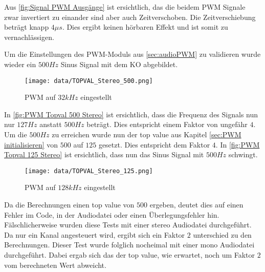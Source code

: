 Aus \autoref{fig:Signal PWM Ausgänge} ist ersichtlich, das die beidem PWM Signale zwar invertiert zu einander sind aber auch Zeitverschoben. Die Zeitverschiebung beträgt knapp $4\mu s$. Dies ergibt keinen hörbaren Effekt und ist somit zu vernachlässigen.

Um die Einstellungen des PWM-Moduls aus \ref{sec:audioPWM} zu validieren wurde wieder ein $500Hz$ Sinus Signal mit dem KO abgebildet.


\begin{figure}
\center
\texttt{[image: data/TOPVAL\_Stereo\_500.png]}
\caption{PWM auf $32kHz$ eingestellt}
\label{fig:PWM Topval 500 Stereo}
\end{figure}

In \autoref{fig:PWM Topval 500 Stereo} ist ersichtlich, dass die Frequenz des Signals nun nur $127Hz$ anstatt $500Hz$ beträgt. Dies entspricht einem Faktor von ungefähr $4$. Um die $500Hz$ zu erreichen wurde nun der top value aus Kapitel \ref{sec:PWM initialisieren} von $500$ auf $125$ gesetzt. Dies entspricht dem Faktor $4$. In \autoref{fig:PWM Topval 125 Stereo} ist ersichtlich, dass nun das Sinus Signal mit $500Hz$ schwingt.
\newpage

\begin{figure}[ht!]
\center
\texttt{[image: data/TOPVAL\_Stereo\_125.png]}
\caption{PWM auf $128kHz$ eingestellt}
\label{fig:PWM Topval 125 Stereo}
\end{figure}

Da die Berechnungen einen top value von $500$ ergeben, deutet dies auf einen Fehler im Code, in der Audiodatei oder einen Überlegungsfehler hin. Fälschlicherweise wurden diese Tests mit einer stereo Audiodatei durchgeführt. Da nur ein Kanal angesteuert wird, ergibt sich ein Faktor $2$ unterschied zu den Berechnungen. Dieser Test wurde folglich nocheimal mit einer mono Audiodatei durchgeführt. Dabei ergab sich das der top value, wie erwartet, noch um Faktor $2$ vom berechneten Wert abweicht. 


